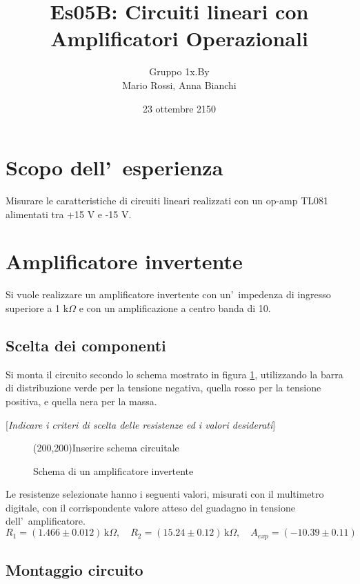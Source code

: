 \documentclass[10pt,a4paper]{article}
\author{Gruppo 1x.By \\ Mario Rossi, Anna Bianchi \rem{non dimenticate i nomi}}
\title{Es05B: Circuiti lineari con Amplificatori Operazionali}
\newcommand{\rem}[1]{[\emph{#1}]}
\begin{document}
	\date{23 ottembre 2150}
	\maketitle
	
	
	\section*{Scopo dell'~esperienza}
	Misurare le caratteristiche di circuiti lineari realizzati con un op-amp TL081 alimentati tra +15 V e -15 V.
	
	\section{Amplificatore invertente}
	Si vuole realizzare un amplificatore invertente con un'~impedenza di ingresso superiore a 1 
	k$\Omega$ e con un amplificazione a centro banda di 10.
	
	\subsection{Scelta dei componenti}
	
	Si monta il circuito secondo lo schema mostrato in figura \ref{fig:ampinv}, utilizzando la barra di 
	distribuzione verde per la tensione negativa, quella rosso per la tensione positiva, e quella nera per 
	la massa.
	
	\rem{Indicare i criteri di scelta delle resistenze ed i valori desiderati}
	\begin{figure}[h]
		\begin{center}
			\framebox(200,200){Inserire schema circuitale}
			\caption{\small Schema di un amplificatore invertente}
			\label{fig:ampinv}
		\end{center}
	\end{figure}
	
	Le resistenze selezionate hanno i seguenti valori, misurati con il multimetro digitale, con il corrispondente valore atteso 
	del guadagno in tensione dell'~amplificatore.
	\[
	R_1 = ( 1.466 \pm 0.012) \,\mathrm{k}\Omega, \quad 
	R_2 = (15.24  \pm 0.12) \,\mathrm{k}\Omega, \quad 
	A_{exp} = ( -10.39 \pm 0.11)
	\]
	
	\subsection{Montaggio circuito}
	
\end{document}
